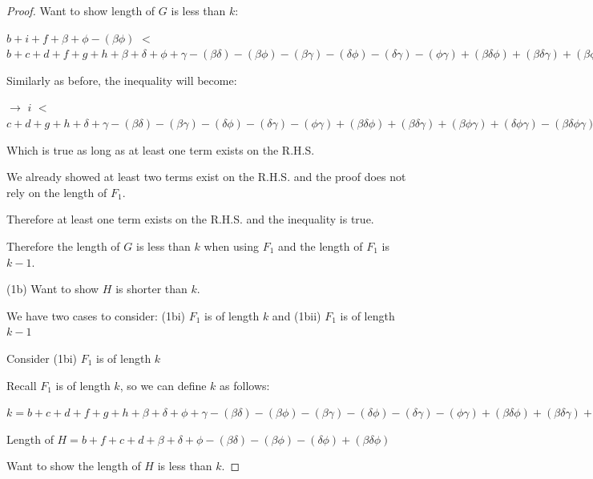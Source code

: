 \documentclass[manuscript]{acmart}
\begin{document}
\begin{proof}
        Want to show length of $G$ is less than $k$:

        $b + i + f + \beta + \phi - (\beta \phi)$
        $<$
        $b + c + d + f + g + h 
        + \beta + \delta + \phi + \gamma
        - (\beta \delta) - (\beta \phi) - (\beta \gamma) - (\delta \phi) - (\delta \gamma) - (\phi \gamma)
        + (\beta \delta \phi) + (\beta \delta \gamma) + (\beta \phi \gamma) + (\delta \phi \gamma)
        - (\beta \delta \phi \gamma) 
        + 1
        $

        Similarly as before, the inequality will become:

        $\rightarrow$ $i$
        $<$
        $c + d + g + h 
         + \delta + \gamma
        - (\beta \delta) - (\beta \gamma) - (\delta \phi) - (\delta \gamma) - (\phi \gamma)
        + (\beta \delta \phi) + (\beta \delta \gamma) + (\beta \phi \gamma) + (\delta \phi \gamma)
        - (\beta \delta \phi \gamma) 
        + 1
        $

        Which is true as long as at least one term exists on the R.H.S.

        We already showed at least two terms exist on the R.H.S. and the proof does not rely on the length of $F_1$.

        Therefore at least one term exists on the R.H.S. and the inequality is true.

        Therefore the length of $G$ is less than $k$ when using $F_1$ and the length of $F_1$ is $k - 1$.

        (1b) Want to show $H$ is shorter than $k$.

        We have two cases to consider: (1bi) $F_1$ is of length $k$ and (1bii) $F_1$ is of length $k-1$

        Consider (1bi) $F_1$ is of length $k$

        Recall $F_1$ is of length $k$, so we can define $k$ as follows:

        $k = b + c + d + f + g + h 
        + \beta + \delta + \phi + \gamma
        - (\beta \delta) - (\beta \phi) - (\beta \gamma) - (\delta \phi) - (\delta \gamma) - (\phi \gamma)
        + (\beta \delta \phi) + (\beta \delta \gamma) + (\beta \phi \gamma) + (\delta \phi \gamma)
        - (\beta \delta \phi \gamma)
        $

        Length of $H = b + f + c + d 
        + \beta + \delta + \phi
        - (\beta \delta) - (\beta \phi) - (\delta \phi)
        + (\beta \delta \phi) $

        Want to show the length of $H$ is less than $k$.


\end{proof}
\end{document}
